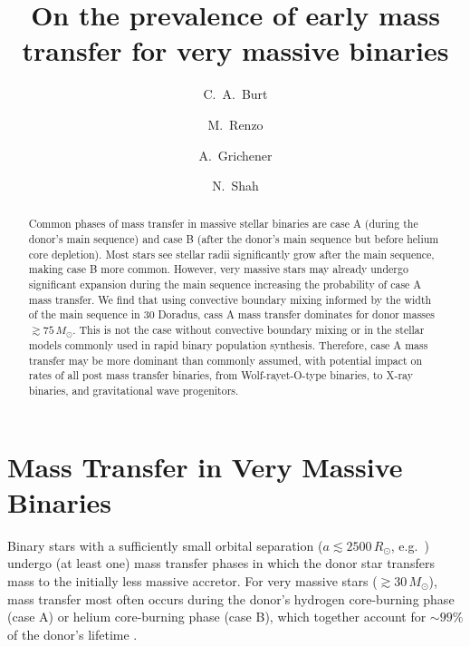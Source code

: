 \documentclass[twocolumn]{aastex63}
\begin{document}
\title{On the prevalence of early mass transfer for very massive binaries}

\author[0009-0008-2061-4946]{C.~A.~Burt}

\author[0000-0002-6718-9472]{M.~Renzo}

\author[0000-0002-2215-1841]{A.~Grichener}

\author[0000-0002-8465-8090]{N.~Shah}

\begin{abstract}
  Common phases of mass transfer in massive stellar binaries are case A
  (during the donor's main sequence) and case B (after the donor's
  main sequence but before helium core depletion). Most stars see
  stellar radii significantly grow after the main sequence, making
  case B more common. However, very massive stars may already undergo
  significant expansion during the main sequence increasing the
  probability of case A mass transfer. We find that using convective
  boundary mixing informed by the width of the main sequence in 30
  Doradus, cass A mass transfer dominates for donor masses
  $\gtrsim 75 \, M_{\odot}$. This is not the case without convective
  boundary mixing or in the stellar models commonly used in rapid
  binary population synthesis.  Therefore, case A mass transfer may be
  more dominant than commonly assumed, with potential impact on rates
  of all post mass transfer binaries, from Wolf-rayet-O-type binaries,
  to X-ray binaries, and gravitational wave progenitors.
\end{abstract}

\section{Mass Transfer in Very Massive Binaries}

Binary stars with a sufficiently small orbital separation
($a\lesssim2500\,R_{\odot}$, e.g.~\citealt{sana:12}) undergo (at least
one) mass transfer phases in which the donor star transfers mass to
the initially less massive accretor. For very massive stars
($ \gtrsim 30 \, M_{\odot}$), mass transfer most often occurs during
the donor's hydrogen core-burning phase (case A) or helium
core-burning phase (case B), which together account for $\sim99\%$ of
the donor's lifetime \citep{kippenhahn:67}.
\end{document}
